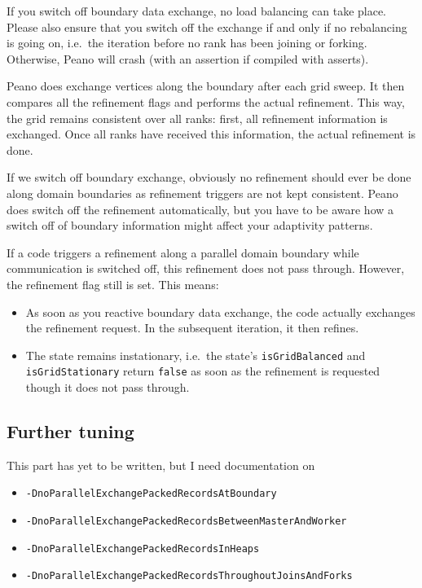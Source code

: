 \begin{remark}
  If you switch off boundary data exchange, no load balancing can take place.
  Please also ensure that you switch off the exchange if and only if no
  rebalancing is going on, i.e.~the iteration before no rank has been joining or
  forking. 
  Otherwise, Peano will crash (with an assertion if compiled with asserts).
\end{remark}


\noindent
Peano does exchange vertices along the boundary after each grid sweep. 
It then compares all the refinement flags and performs the actual refinement.
This way, the grid remains consistent over all ranks: first, all refinement
information is exchanged. 
Once all ranks have received this information, the actual refinement is done.

If we switch off boundary exchange, obviously no refinement should ever be done
along domain boundaries as refinement triggers are not kept consistent.
Peano does switch off the refinement automatically, but you have to be aware how
a switch off of boundary information might affect your adaptivity patterns.

If a code triggers a refinement along a parallel domain boundary while
communication is switched off, this refinement does not pass through.
However, the refinement flag still is set. 
This means:
\begin{itemize}
  \item As soon as you reactive boundary data exchange, the code actually
  exchanges the refinement request. In the subsequent iteration, it then
  refines.
  \item The state remains instationary, i.e.~the state's \texttt{isGridBalanced}
  and \texttt{isGridStationary} return \texttt{false} as soon as the refinement
  is requested though it does not pass through.
\end{itemize}



\subsection{Further tuning}
This part has yet to be written, but I need documentation on 

\begin{itemize}
  \item \texttt{-DnoParallelExchangePackedRecordsAtBoundary}
  \item \texttt{-DnoParallelExchangePackedRecordsBetweenMasterAndWorker}
  \item \texttt{-DnoParallelExchangePackedRecordsInHeaps}
  \item \texttt{-DnoParallelExchangePackedRecordsThroughoutJoinsAndForks}
\end{itemize}

